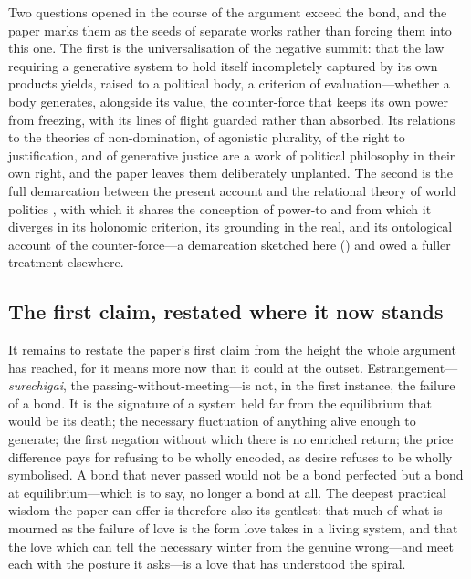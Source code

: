 Two questions opened in the course of the argument exceed the bond, and the paper marks them as the seeds of separate works rather than forcing them into this one. The first is the universalisation of the negative summit: that the law requiring a generative system to hold itself incompletely captured by its own products yields, raised to a political body, a criterion of evaluation---whether a body generates, alongside its value, the counter-force that keeps its own power from freezing, with its lines of flight guarded rather than absorbed. Its relations to the theories of non-domination, of agonistic plurality, of the right to justification, and of generative justice \parencite{eglash2016} are a work of political philosophy in their own right, and the paper leaves them deliberately unplanted. The second is the full demarcation between the present account and the relational theory of world politics \parencite{qin2018}, with which it shares the conception of power-to and from which it diverges in its holonomic criterion, its grounding in the real, and its ontological account of the counter-force---a demarcation sketched here () and owed a fuller treatment elsewhere.

\subsection{The first claim, restated where it now stands}
\label{p17:sub:concl-first}

It remains to restate the paper's first claim from the height the whole argument has reached, for it means more now than it could at the outset. Estrangement---\emph{surechigai}, the passing-without-meeting---is not, in the first instance, the failure of a bond. It is the signature of a system held far from the equilibrium that would be its death; the necessary fluctuation of anything alive enough to generate; the first negation without which there is no enriched return; the price difference pays for refusing to be wholly encoded, as desire refuses to be wholly symbolised. A bond that never passed would not be a bond perfected but a bond at equilibrium---which is to say, no longer a bond at all. The deepest practical wisdom the paper can offer is therefore also its gentlest: that much of what is mourned as the failure of love is the form love takes in a living system, and that the love which can tell the necessary winter from the genuine wrong---and meet each with the posture it asks---is a love that has understood the spiral.

